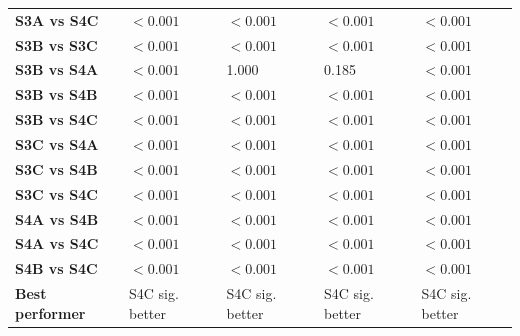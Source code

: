 \begin{table}[H]
{\begin{tabular}{lllll}
        \textbf{S3A vs S4C} & $< 0.001$ & $< 0.001$ & $< 0.001$ & $< 0.001$ \\
        \textbf{S3B vs S3C} & $< 0.001$ & $< 0.001$ & $< 0.001$ & $< 0.001$ \\
        \textbf{S3B vs S4A} & $< 0.001$ & 1.000 & 0.185 & $< 0.001$ \\
        \textbf{S3B vs S4B} & $< 0.001$ & $< 0.001$ & $< 0.001$ & $< 0.001$ \\
        \textbf{S3B vs S4C} & $< 0.001$ & $< 0.001$ & $< 0.001$ & $< 0.001$ \\
        \textbf{S3C vs S4A} & $< 0.001$ & $< 0.001$ & $< 0.001$ & $< 0.001$ \\
        \textbf{S3C vs S4B} & $< 0.001$ & $< 0.001$ & $< 0.001$ & $< 0.001$ \\
        \textbf{S3C vs S4C} & $< 0.001$ & $< 0.001$ & $< 0.001$ & $< 0.001$ \\
        \textbf{S4A vs S4B} & $< 0.001$ & $< 0.001$ & $< 0.001$ & $< 0.001$ \\
        \textbf{S4A vs S4C} & $< 0.001$ & $< 0.001$ & $< 0.001$ & $< 0.001$ \\
        \textbf{S4B vs S4C} & $< 0.001$ & $< 0.001$ & $< 0.001$ & $< 0.001$ \\
        \textbf{Best performer} & S4C sig. better & S4C sig. better & S4C sig. better & S4C sig. better \\
        \bottomrule
    \end{tabular}}
\end{table}